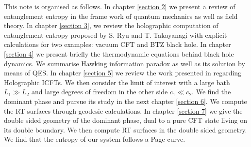 This note is organised as follows. In chapter \ref{section 2} we present a review of entanglement entropy in the frame work of quantum mechanics as well as field theory. In chapter \ref{section 3}, we review the holographic computation of entanglement entropy proposed by S. Ryu and T. Takayanagi\cite{Ryu, Ryu_2006} with explicit calculations for two examples: vacuum CFT and BTZ black hole. In chapter \ref{section 4} we present briefly the thermodynamic equations behind black hole dynamics. We summarise Hawking information paradox as well as its solution by means of QES. In chapter \ref{section 5} we review the work presented in \cite{Bachas_2021} regarding Holographic ICFTs. We then consider the limit of interest with a large bath $L_1\gg L_2$ and large degrees of freedom in the other side $c_1\ll c_2$. We find the dominant phase and pursue its study in the next chapter \ref{section 6}. We compute the RT surfaces through geodesic calculations. In chapter \ref{section 7} we give the double sided geometry of the dominant phase, dual to a pure CFT state living on its double boundary. We then compute RT surfaces in the double sided geometry. We find that the entropy of our system follows a Page curve. 
